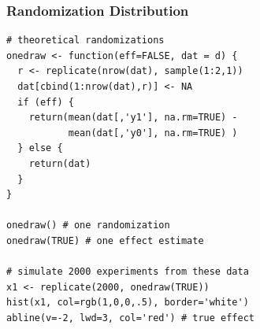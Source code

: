 



\questions


\appendix
\frame{}

\begin{frame}[fragile]

\frametitle{{\large Randomization Distribution}}

\tiny

\begin{verbatim}
# theoretical randomizations
onedraw <- function(eff=FALSE, dat = d) {
  r <- replicate(nrow(dat), sample(1:2,1))
  dat[cbind(1:nrow(dat),r)] <- NA
  if (eff) {
    return(mean(dat[,'y1'], na.rm=TRUE) -
           mean(dat[,'y0'], na.rm=TRUE) )
  } else {
    return(dat)
  }
}

onedraw() # one randomization
onedraw(TRUE) # one effect estimate

# simulate 2000 experiments from these data
x1 <- replicate(2000, onedraw(TRUE))
hist(x1, col=rgb(1,0,0,.5), border='white')
abline(v=-2, lwd=3, col='red') # true effect
\end{verbatim}

\end{frame}


